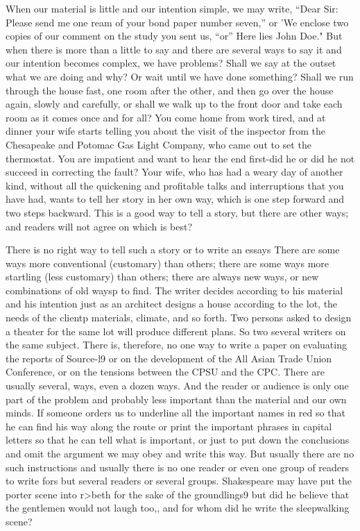 \documentclass[
    oneside,
    11pt,
    draft
]{memoir}
\begin{document}
When our material is little and our intention simple, we may write, \enquote{Dear Sir: Please send me one ream of your bond paper number seven,} or 'We enclose two copies of our comment on the study you sent us, \enquote{or} Here lies John Doe." But when there is more than a little to say and there are several ways to say it and our intention becomes complex, we have problems? Shall we say at the outset what we are doing and why? Or wait until we have done something? Shall we run through the house fast, one room after the other, and then go over the house again, slowly and carefully, or shall we walk up to the front door and take each room as it comes once and for all? You come home from work tired, and at dinner your wife starts telling you about the visit of the inspector from the Chesapeake and Potomac Gas Light Company, who came out to set the thermostat. You are impatient and want to hear the end first-did he or did he not succeed in correcting the fault? Your wife, who has had a weary day of another kind, without all the quickening and profitable talks and interruptions that you have had, wants to tell her story in her own way, which is one step forward and two steps backward. This is a good way to tell a story, but there are other ways; and readers will not agree on which is best?

There is no right way to tell such a story or to write an essays There are some ways more conventional (customary) than others; there are some ways more startling (less customary) than others; there are always new ways, or new combinations of old waysp to find. The writer decides according to his material and his intention just as an architect designs a house according to the lot, the needs of the clientp materials, climate, and so forth. Two persons asked to design a theater for the same lot will produce different plans. So two several writers on the same subject. There is, therefore, no one way to write a paper on evaluating the reports of Source-l9 or on the development of the All Asian Trade Union Conference, or on the tensions between the CPSU and the CPC. There are usually several, ways, even a dozen ways. And the reader or audience is only one part of the problem and probably less important than the material and our own minds. If someone orders us to underline all the important names in red so that he can find his way along the route or print the important phrases in capital letters so that he can tell what is important, or just to put down the conclusions and omit the argument we may obey and write this way. But usually there are no such instructions and usually there is no one reader or even one group of readers to write fors but several readers or several groups. Shakespeare may have put the porter scene into r>beth for the sake of the groundlings9 but did he believe that the gentlemen would not laugh too,, and for whom did he write the sleepwalking scene?
\end{document}
